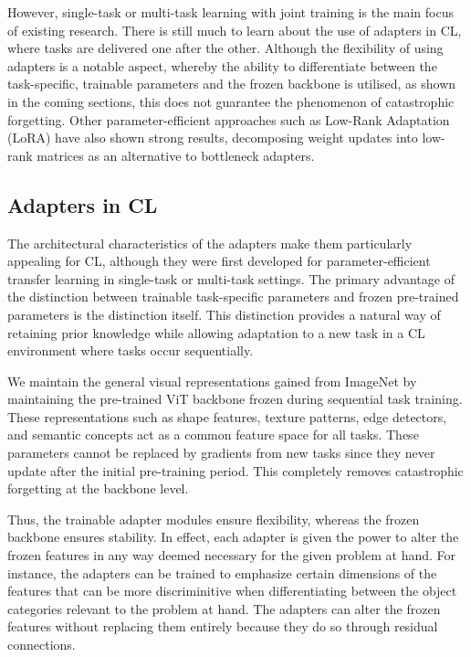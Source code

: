 \documentclass[english, LaM, oneside]{sapthesis}%
\numberwithin{equation}{chapter}
\begin{document}
However, single-task or multi-task learning with joint training is the main focus of existing research. There is still much to learn about the use of adapters in CL, where tasks are delivered one after the other. Although the flexibility of using adapters is a notable aspect, whereby the ability to differentiate between the task-specific, trainable parameters and the frozen backbone is utilised, as shown in the coming sections, this does not guarantee the phenomenon of catastrophic forgetting.
Other parameter-efficient approaches such as Low-Rank Adaptation (LoRA) \cite{34} have also shown strong results, decomposing weight updates into low-rank matrices as an alternative to bottleneck adapters.

\subsection{Adapters in CL}
\label{sec:3.4.3}
The architectural characteristics of the adapters make them particularly appealing for CL, although they were first developed for parameter-efficient transfer learning in single-task or multi-task settings. The primary advantage of the distinction between trainable task-specific parameters and frozen pre-trained parameters is the distinction itself. This distinction provides a natural way of retaining prior knowledge while allowing adaptation to a new task in a CL environment where tasks occur sequentially.

We maintain the general visual representations gained from ImageNet by maintaining the pre-trained ViT backbone frozen during sequential task training. These representations such as shape features, texture patterns, edge detectors, and semantic concepts act as a common feature space for all tasks. These parameters cannot be replaced by gradients from new tasks since they never update after the initial pre-training period. This completely removes catastrophic forgetting at the backbone level.

Thus, the trainable adapter modules ensure flexibility, whereas the frozen backbone ensures stability\cite{11}. In effect, each adapter is given the power to alter the frozen features in any way deemed necessary for the given problem at hand. For instance, the adapters can be trained to emphasize certain dimensions of the features that can be more discriminitive when differentiating between the object categories relevant to the problem at hand. The adapters can alter the frozen features without replacing them entirely because they do so through residual connections.
\end{document}
